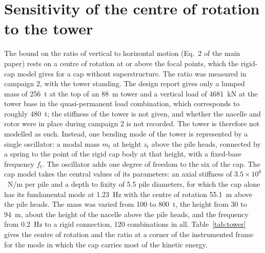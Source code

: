 \documentclass[11pt]{article}
\begin{document}
\section{Sensitivity of the centre of rotation to the tower}
\label{sec:s-tower}

The bound on the ratio of vertical to horizontal motion (Eq.~2 of the main
paper) rests on a centre of rotation at or above the focal points, which the
rigid-cap model gives for a cap without superstructure. The ratio was measured
in campaign 2, with the tower standing. The design report gives only a lumped
mass of 256~t at the top of an 88~m tower and a vertical load of 4681~kN at the
tower base in the quasi-permanent load combination, which corresponds to
roughly 480~t; the stiffness of the tower is not given, and whether the nacelle
and rotor were in place during campaign 2 is not recorded. The tower is
therefore not modelled as such. Instead, one bending mode of the tower is
represented by a single oscillator: a modal mass $m_t$ at height $z_t$ above
the pile heads, connected by a spring to the point of the rigid cap body at
that height, with a fixed-base frequency $f_t$. The oscillator adds one degree
of freedom to the six of the cap. The cap model takes the central values of its
parameters: an axial stiffness of $3.5\times10^{8}$~N/m per pile and a depth to
fixity of 5.5 pile diameters, for which the cap alone has its fundamental mode
at 1.23~Hz with the centre of rotation 55.1~m above the pile heads. The mass
was varied from 100 to 800~t, the height from 30 to 94~m, about the height of the nacelle above the pile heads, and the frequency from 0.2~Hz to a rigid connection, 120
combinations in all. Table~\ref{tab:tower} gives the centre of rotation and the
ratio at a corner of the instrumented frame for the mode in which the cap
carries most of the kinetic energy.
\end{document}
